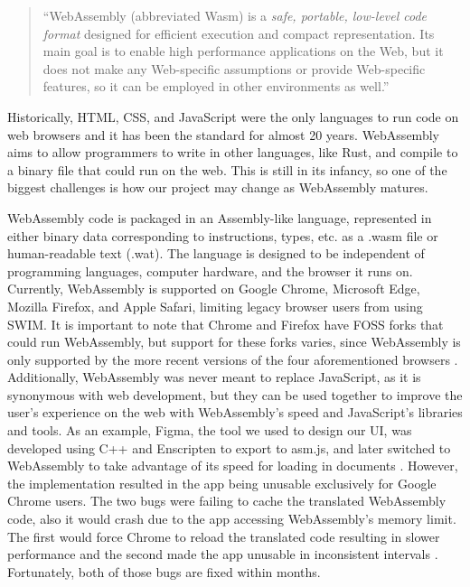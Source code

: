 \documentclass[
    paper=letter,
    parskip=half,
    fontsize=12pt,
    titlepage=firstiscover,
    toc=bibliography,
    numbers=endperiod
]{scrartcl}
\begin{document}
\begin{quote}
    ``WebAssembly (abbreviated Wasm) is a \emph{safe, portable, low-level
        code format} designed for efficient execution and compact
    representation. Its main goal is to enable high performance applications
    on the Web, but it does not make any Web-specific assumptions or provide
    Web-specific features, so it can be employed in other environments as
    well.'' \cite{webassembly-introduction}
\end{quote}

Historically, HTML, CSS, and JavaScript were the only languages to run
code on web browsers and it has been the standard for almost 20 years.
WebAssembly aims to allow programmers to write in other languages, like
Rust, and compile to a binary file that could run on the web. This is
still in its infancy, so one of the biggest challenges is how our
project may change as WebAssembly matures.

WebAssembly code is packaged in an Assembly-like language, represented
in either binary data corresponding to instructions, types, etc. as a
.wasm file or human-readable text (.wat). The language is designed to be
independent of programming languages, computer hardware, and the browser
it runs on. Currently, WebAssembly is supported on Google Chrome,
Microsoft Edge, Mozilla Firefox, and Apple Safari, limiting legacy
browser users from using SWIM. It is important to note that Chrome and
Firefox have FOSS forks that could run WebAssembly, but support for
these forks varies, since WebAssembly is only supported by the more
recent versions of the four aforementioned browsers
\cite{mdn-webassembly}. Additionally, WebAssembly was never meant to
replace JavaScript, as it is synonymous with web development, but they
can be used together to improve the user's experience on the web with
WebAssembly's speed and JavaScript's libraries and tools. As an example,
Figma, the tool we used to design our UI, was developed using C++ and
Enscripten to export to asm.js, and later switched to WebAssembly to
take advantage of its speed for loading in documents
\cite{figma-webassembly, madewithwebassembly-figma}. However, the
implementation resulted in the app being unusable exclusively for Google
Chrome users. The two bugs were failing to cache the translated
WebAssembly code, also it would crash due to the app accessing
WebAssembly's memory limit. The first would force Chrome to reload the
translated code resulting in slower performance and the second made the
app unusable in inconsistent intervals \cite{chromium-webassembly-bug1,
    chromium-webassembly-bug2}. Fortunately, both of those bugs are fixed
within months.
\end{document}
